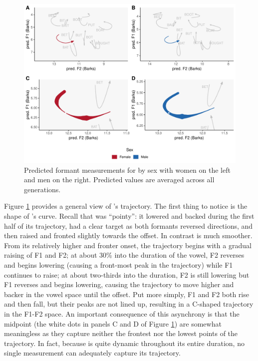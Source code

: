 \begin{figure}[tb!]
    \centering
    \includegraphics[width = 6.5in]{Figures/BAN/BAN_four_panel_plot_summarized.pdf}
    \caption[Predicted formant measurements for \ban by sex.]{Predicted formant measurements for \ban by sex with women on the left and men on the right. Predicted values are averaged across all generations.}
    \label{fig:BAN_four_panel_plot_summarized}
\end{figure}

Figure \ref{fig:BAN_four_panel_plot_summarized} provides a general view of \ban's trajectory. The first thing to notice is the shape of \ban's curve. Recall that \bat was ``pointy'': it lowered and backed during the first half of its trajectory, had a clear target as both formants reversed directions, and then raised and fronted slightly towards the offset. In contrast \ban is much smoother. From its relatively higher and fronter onset, the trajectory begins with a gradual raising of F1 and F2; at about 30\% into the duration of the vowel, F2 reverses and begins lowering (causing a front-most peak in the trajectory) while F1 continues to raise; at about two-thirds into the duration, F2 is still lowering but F1 reverses and begins lowering, causing the trajectory to move higher and backer in the vowel space until the offset. Put more simply, F1 and F2 both rise and then fall, but their peaks are not lined up, resulting in a C-shaped trajectory in the F1-F2 space. An important consequence of this asynchrony is that the midpoint (the white dots in panels C and D of Figure \ref{fig:BAN_four_panel_plot_summarized}) are somewhat meaningless as they capture neither the frontest nor the lowest points of the trajectory. In fact, because \ban is quite dynamic throughout its entire duration, no single measurement can adequately capture its trajectory.

